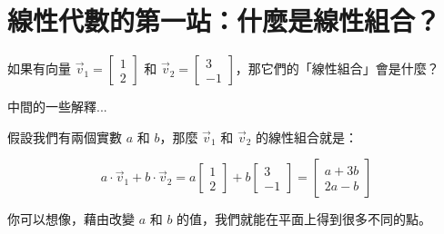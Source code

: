 \documentclass[class=article, crop=false, margin=2cm]{standalone}
\begin{document}
\break
\section{線性代數的第一站：什麼是線性組合？}


\smallerVerticalGap
\smallerVerticalGap

\smallerVerticalGap


\begin{textRight}\begin{readerSaid}
如果有向量 $\vec{v}_1 = \begin{bmatrix}1 \\ 2\end{bmatrix}$ 和 $\vec{v}_2 = \begin{bmatrix}3 \\ -1\end{bmatrix}$，那它們的「線性組合」會是什麼？
\end{readerSaid}\end{textRight}

\begin{center}
中間的一些解釋...
\end{center}

\begin{textLeft}\begin{teacherSaid}
假設我們有兩個實數 $a$ 和 $b$，那麼 $\vec{v}_1$ 和 $\vec{v}_2$ 的線性組合就是：

\[
a \cdot \vec{v}_1 + b \cdot \vec{v}_2 = a \begin{bmatrix}1 \\ 2\end{bmatrix} + b \begin{bmatrix}3 \\ -1\end{bmatrix} = \begin{bmatrix}a + 3b \\ 2a - b\end{bmatrix}
\]

你可以想像，藉由改變 $a$ 和 $b$ 的值，我們就能在平面上得到很多不同的點。
\end{teacherSaid}\end{textLeft}


\smallerVerticalGap
\smallerVerticalGap

\end{document}
